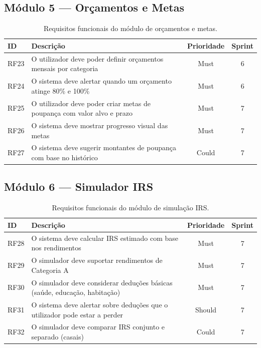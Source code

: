 \subsection{Módulo 5 --- Orçamentos e Metas}

\begin{table}[H]
\centering
\caption{Requisitos funcionais do módulo de orçamentos e metas.}
\label{tab:rf-budgets}
\small
\begin{tabularx}{\textwidth}{l X c c}
\toprule
\textbf{ID} & \textbf{Descrição} & \textbf{Prioridade} & \textbf{Sprint} \\
\midrule
RF23 & O utilizador deve poder definir orçamentos mensais por categoria & Must & 6 \\
RF24 & O sistema deve alertar quando um orçamento atinge 80\% e 100\% & Must & 6 \\
RF25 & O utilizador deve poder criar metas de poupança com valor alvo e prazo & Must & 7 \\
RF26 & O sistema deve mostrar progresso visual das metas & Must & 7 \\
RF27 & O sistema deve sugerir montantes de poupança com base no histórico & Could & 7 \\
\bottomrule
\end{tabularx}
\end{table}

\subsection{Módulo 6 --- Simulador IRS}

\begin{table}[H]
\centering
\caption{Requisitos funcionais do módulo de simulação IRS.}
\label{tab:rf-irs}
\small
\begin{tabularx}{\textwidth}{l X c c}
\toprule
\textbf{ID} & \textbf{Descrição} & \textbf{Prioridade} & \textbf{Sprint} \\
\midrule
RF28 & O sistema deve calcular \ac{IRS} estimado com base nos rendimentos & Must & 7 \\
RF29 & O simulador deve suportar rendimentos de Categoria A & Must & 7 \\
RF30 & O simulador deve considerar deduções básicas (saúde, educação, habitação) & Must & 7 \\
RF31 & O sistema deve alertar sobre deduções que o utilizador pode estar a perder & Should & 7 \\
RF32 & O simulador deve comparar \ac{IRS} conjunto e separado (casais) & Could & 7 \\
\bottomrule
\end{tabularx}
\end{table}

